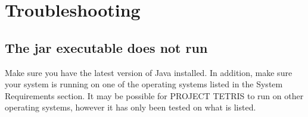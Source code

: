 \documentclass[12pt, titlepage]{article}
\begin{document}
\section{Troubleshooting}

\subsection{The jar executable does not run}
Make sure you have the latest version of Java installed. In addition, make sure your system is running on one of the operating systems listed in the System Requirements section. It may be possible for PROJECT TETRIS to run on other operating systems, however it has only been tested on what is listed.
\end{document}
